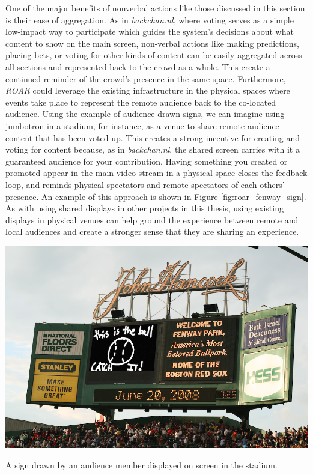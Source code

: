 One of the major benefits of nonverbal actions like those discussed in this section is their ease of aggregation. As in \emph{backchan.nl}, where voting serves as a simple low-impact way to participate which guides the system's decisions about what content to show on the main screen, non-verbal actions like making predictions, placing bets, or voting for other kinds of content can be easily aggregated across all sections and represented back to the crowd as a whole. This create a continued reminder of the crowd's presence in the same space. Furthermore, \emph{ROAR} could leverage the existing infrastructure in the physical spaces where events take place to represent the remote audience back to the co-located audience. Using the example of audience-drawn signs, we can imagine using jumbotron in a stadium, for instance, as a venue to share remote audience content that has been voted up. This creates a strong incentive for creating and voting for content because, as in \emph{backchan.nl}, the shared screen carries with it a guaranteed audience for your contribution. Having something you created or promoted appear in the main video stream in a physical space closes the feedback loop, and reminds physical spectators and remote spectators of each others' presence. An example of this approach is shown in Figure \ref{fig:roar_fenway_sign}. As with using shared displays in other projects in this thesis, using existing displays in physical venues can help ground the experience between remote and local audiences and create a stronger sense that they are sharing an experience.

\begin{marginfigure}
	\includegraphics{figures/roar/stadium_sign_small.png}
	\caption{A sign drawn by an audience member displayed on screen in the stadium.}
	\label{fig:roar_fenway_sign}
\end{marginfigure}



